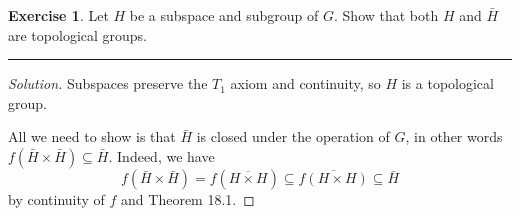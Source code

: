 \documentclass{article}
\theoremstyle{definition}
\newtheorem{exercise'}{Exercise}
\begin{document}
\begin{exercise'}
  Let $H$ be a subspace and subgroup of $G$. Show that both $H$ and $\bar{H}$ are topological groups.
\end{exercise'}
\hrule
\begin{proof}[Solution]
  Subspaces preserve the $T_1$ axiom and continuity, so $H$ is a topological group.

  All we need to show is that $\bar{H}$ is closed under the operation of $G$, in other words $f(\bar{H}\times\bar{H}) \subseteq\bar{H}$. Indeed, we have
  $$f(\bar{H}\times\bar{H}) = f(\overline{H\times H}) \subseteq \overline{f(H\times H)} \subseteq \bar{H}$$
  by continuity of $f$ and Theorem 18.1.
\end{proof}

\pagebreak
\end{document}
